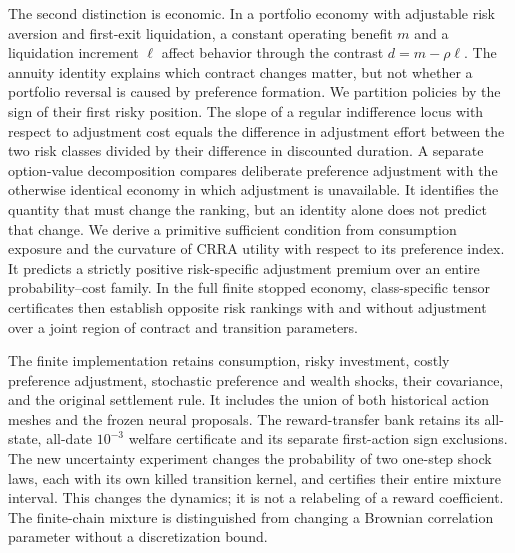 The second distinction is economic. In a portfolio economy with adjustable risk aversion and first-exit liquidation, a constant operating benefit $m$ and a liquidation increment $\ell$ affect behavior through the contrast $d=m-\rho\ell$. The annuity identity explains which contract changes matter, but not whether a portfolio reversal is caused by preference formation. We partition policies by the sign of their first risky position. The slope of a regular indifference locus with respect to adjustment cost equals the difference in adjustment effort between the two risk classes divided by their difference in discounted duration. A separate option-value decomposition compares deliberate preference adjustment with the otherwise identical economy in which adjustment is unavailable. It identifies the quantity that must change the ranking, but an identity alone does not predict that change. We derive a primitive sufficient condition from consumption exposure and the curvature of CRRA utility with respect to its preference index. It predicts a strictly positive risk-specific adjustment premium over an entire probability--cost family. In the full finite stopped economy, class-specific tensor certificates then establish opposite risk rankings with and without adjustment over a joint region of contract and transition parameters.

The finite implementation retains consumption, risky investment, costly preference adjustment, stochastic preference and wealth shocks, their covariance, and the original settlement rule. It includes the union of both historical action meshes and the frozen neural proposals. The reward-transfer bank retains its all-state, all-date $10^{-3}$ welfare certificate and its separate first-action sign exclusions. The new uncertainty experiment changes the probability of two one-step shock laws, each with its own killed transition kernel, and certifies their entire mixture interval. This changes the dynamics; it is not a relabeling of a reward coefficient. The finite-chain mixture is distinguished from changing a Brownian correlation parameter without a discretization bound.


